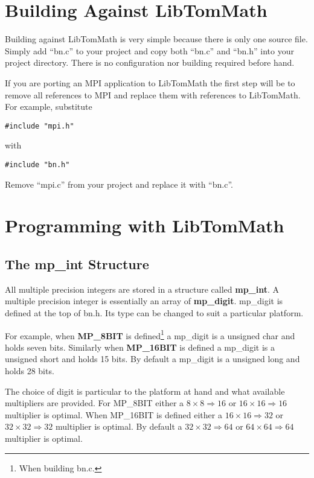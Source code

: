 \documentclass{article}
\begin{document}
\section{Building Against LibTomMath}

Building against LibTomMath is very simple because there is only one source file.  Simply add ``bn.c'' to your project and 
copy both ``bn.c'' and ``bn.h'' into your project directory.  There is no configuration nor building required before hand.

If you are porting an MPI application to LibTomMath the first step will be to remove all references to MPI and replace them 
with references to LibTomMath.  For example, substitute 

\begin{verbatim}
#include "mpi.h"
\end{verbatim}

with 

\begin{verbatim}
#include "bn.h"
\end{verbatim}

Remove ``mpi.c'' from your project and replace it with ``bn.c''.

\section{Programming with LibTomMath}

\subsection{The mp\_int Structure}
All multiple precision integers are stored in a structure called \textbf{mp\_int}.  A multiple precision integer is
essentially an array of \textbf{mp\_digit}.  mp\_digit is defined at the top of bn.h.  Its type can be changed to suit
a particular platform.  

For example, when \textbf{MP\_8BIT} is defined\footnote{When building bn.c.} a mp\_digit is a unsigned char and holds 
seven bits.  Similarly when \textbf{MP\_16BIT} is defined a mp\_digit is a unsigned short and holds 15 bits.  
By default a mp\_digit is a unsigned long and holds 28 bits.  

The choice of digit is particular to the platform at hand and what available multipliers are provided.  For 
MP\_8BIT either a $8 \times 8 \Rightarrow 16$ or $16 \times 16 \Rightarrow 16$ multiplier is optimal.  When 
MP\_16BIT is defined either a $16 \times 16 \Rightarrow 32$ or $32 \times 32 \Rightarrow 32$ multiplier is optimal.  By
default a $32 \times 32 \Rightarrow 64$ or $64 \times 64 \Rightarrow 64$ multiplier is optimal.  
\end{document}

